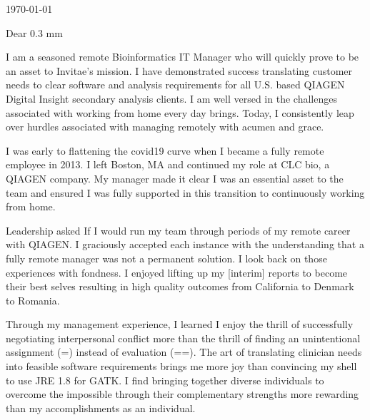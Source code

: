 \documentclass[10pt,letterpaper]{article}
\newcommand{\titleto}[1]{\renewcommand{\titleto}{#1}}
\newcommand{\nameto}[1]{\renewcommand{\nameto}{#1}}
\newcommand{\addrto}[1]{\renewcommand{\addrto}{#1}}
\begin{document}

\begin{flushright}

    \today
\end{flushright}


\nameto
\addrto


Dear \titleto \hspace{0.3 mm} \nameto,



I am a seasoned remote Bioinformatics IT Manager who will quickly prove to be an asset to Invitae’s mission. I have demonstrated success translating customer needs to clear software and analysis requirements for all U.S. based QIAGEN Digital Insight secondary analysis clients. I am well versed in the challenges associated with working from home every day brings. Today, I consistently leap over hurdles associated with managing remotely with acumen and grace.

I was early to flattening the covid19 curve when I became a fully remote employee in 2013. I left Boston, MA and continued my role at CLC bio, a QIAGEN company. My manager made it clear I was an essential asset to the team and ensured I was fully supported in this transition to continuously working from home.

Leadership asked If I would run my team through periods of my remote career with QIAGEN. I graciously accepted each instance with the understanding that a fully remote manager was not a permanent solution. I look back on those experiences with fondness. I enjoyed lifting up my [interim] reports to become their best selves resulting in high quality outcomes from California to Denmark to Romania. 

Through my management experience, I learned I enjoy the thrill of successfully negotiating interpersonal conflict more than the thrill of finding an unintentional assignment (=) instead of evaluation (==). The art of translating clinician needs into feasible software requirements brings me more joy than convincing my shell to use JRE 1.8 for GATK. I find bringing together diverse individuals to overcome the impossible through their complementary strengths more rewarding than my accomplishments as an individual. 
\end{document}
